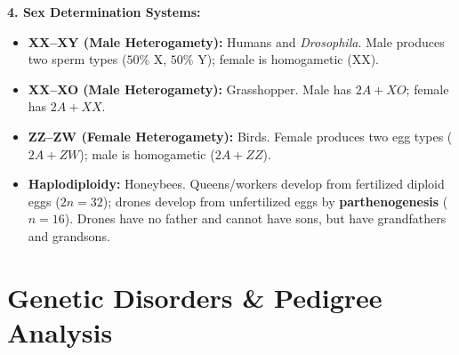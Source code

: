 \documentclass[10pt,twoside,openright]{book}
\begin{document}
\begin{formulabox}
\textbf{4. Sex Determination Systems:}
\begin{itemize}
  \item \textbf{XX--XY (Male Heterogamety):} Humans and \textit{Drosophila}. Male produces two sperm types ($50\%$ X, $50\%$ Y); female is homogametic (XX).
  \item \textbf{XX--XO (Male Heterogamety):} Grasshopper. Male has $2A + XO$; female has $2A + XX$.
  \item \textbf{ZZ--ZW (Female Heterogamety):} Birds. Female produces two egg types ($2A + ZW$); male is homogametic ($2A + ZZ$).
  \item \textbf{Haplodiploidy:} Honeybees. Queens/workers develop from fertilized diploid eggs ($2n=32$); drones develop from unfertilized eggs by \textbf{parthenogenesis} ($n=16$). Drones have no father and cannot have sons, but have grandfathers and grandsons.
\end{itemize}
\end{formulabox}

\section{Genetic Disorders \& Pedigree Analysis}
\end{document}
